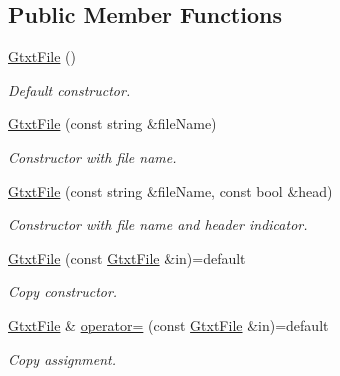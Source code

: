 \subsection*{Public Member Functions}
\begin{DoxyCompactItemize}
\item 
\mbox{\label{classsamp_files_1_1_gtxt_file_a43c69cb8dd8736b9e39014b2308661d6}} 
\hyperlink{classsamp_files_1_1_gtxt_file_a43c69cb8dd8736b9e39014b2308661d6}{Gtxt\+File} ()
\begin{DoxyCompactList}\small\item\em Default constructor. \end{DoxyCompactList}\item 
\hyperlink{classsamp_files_1_1_gtxt_file_a8fa6b2a9127d2c66de0c4d6b14555e66}{Gtxt\+File} (const string \&file\+Name)
\begin{DoxyCompactList}\small\item\em Constructor with file name. \end{DoxyCompactList}\item 
\hyperlink{classsamp_files_1_1_gtxt_file_a401ff9bae54850c2bcd54722f80aa479}{Gtxt\+File} (const string \&file\+Name, const bool \&head)
\begin{DoxyCompactList}\small\item\em Constructor with file name and header indicator. \end{DoxyCompactList}\item 
\mbox{\label{classsamp_files_1_1_gtxt_file_a4f0a23f83e9f5085e086f1f8f0f39d12}} 
\hyperlink{classsamp_files_1_1_gtxt_file_a4f0a23f83e9f5085e086f1f8f0f39d12}{Gtxt\+File} (const \hyperlink{classsamp_files_1_1_gtxt_file}{Gtxt\+File} \&in)=default
\begin{DoxyCompactList}\small\item\em Copy constructor. \end{DoxyCompactList}\item 
\mbox{\label{classsamp_files_1_1_gtxt_file_a062fb2cc37eedf763eba9184ff29dc5e}} 
\hyperlink{classsamp_files_1_1_gtxt_file}{Gtxt\+File} \& \hyperlink{classsamp_files_1_1_gtxt_file_a062fb2cc37eedf763eba9184ff29dc5e}{operator=} (const \hyperlink{classsamp_files_1_1_gtxt_file}{Gtxt\+File} \&in)=default
\begin{DoxyCompactList}\small\item\em Copy assignment. \end{DoxyCompactList}\item 

\end{DoxyCompactItemize}
